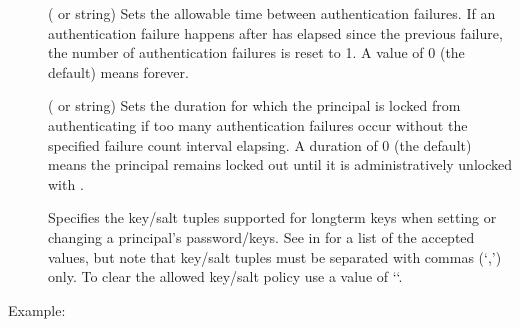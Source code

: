 \documentclass[letterpaper,10pt,english]{sphinxmanual}
\begin{document}
\label{\detokenize{admin/admin_commands/kadmin_local:policy-failurecountinterval}}\begin{description}
\item[{ }] \leavevmode
\sphinxAtStartPar
( or  string) Sets the allowable time
between authentication failures.  If an authentication failure
happens after  has elapsed since the previous
failure, the number of authentication failures is reset to 1.  A
 value of 0 (the default) means forever.

\end{description}
\label{\detokenize{admin/admin_commands/kadmin_local:policy-lockoutduration}}\begin{description}
\item[{ }] \leavevmode
\sphinxAtStartPar
( or  string) Sets the duration for
which the principal is locked from authenticating if too many
authentication failures occur without the specified failure count
interval elapsing.  A duration of 0 (the default) means the
principal remains locked out until it is administratively unlocked
with .

\item[{}] \leavevmode
\sphinxAtStartPar
Specifies the key/salt tuples supported for long\sphinxhyphen{}term keys when
setting or changing a principal’s password/keys.  See
{\hyperref[\detokenize{admin/conf_files/kdc_conf:keysalt-lists}]{}} in {\hyperref[\detokenize{admin/conf_files/kdc_conf:kdc-conf-5}]{}} for a list of the
accepted values, but note that key/salt tuples must be separated
with commas (‘,’) only.  To clear the allowed key/salt policy use
a value of ‘\sphinxhyphen{}‘.

\end{description}

\sphinxAtStartPar
Example:

\begin{sphinxVerbatim}[commandchars=\\\{\}]
      
\end{sphinxVerbatim}
\end{document}
